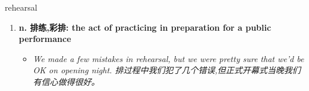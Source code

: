 
\begin{frame}
{\huge rehearsal}
\begin{center}
\begin{enumerate}\Large
  \item \textbf{n. 排练,彩排: the act of practicing in preparation for a public performance}
  \begin{itemize}
    \item \em{\Large{We made a few mistakes in rehearsal, but we were pretty sure that we'd be OK on opening night. 排过程中我们犯了几个错误,但正式开幕式当晚我们有信心做得很好。}}
  \end{itemize}
\end{enumerate}
\end{center}
\end{frame}
